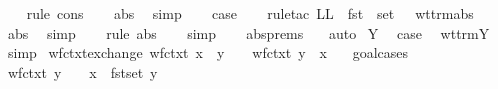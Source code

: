 \begin{isabellebody}
\ \ \isamarkupfalse%
\ {\isacharparenleft}rule\ cons{\isacharparenright}\isanewline
\ \ \isamarkupfalse%
\ abs\ \isamarkupfalse%
\ simp{\isacharplus}\isanewline
\isanewline
\ \ \isamarkupfalse%
\ {\isacharquery}case\isanewline
\ \ \isamarkupfalse%
\ {\isacharparenleft}rule{\isacharunderscore}tac\ L{\isacharequal}{\isachardoublequoteopen}L\ {\isasymunion}\ fst\ {\isacharbackquote}\ set\ {\isasymGamma}{\isacharprime}{\isachardoublequoteclose}\ \ wt{\isacharunderscore}trm{\isachardot}abs{\isacharparenright}\isanewline
\ \ \isamarkupfalse%
\ abs\ \isamarkupfalse%
\ simp\isanewline
\ \ \isamarkupfalse%
\ {\isacharparenleft}rule\ abs{\isacharparenleft}{}{\isacharparenright}{\isacharparenright}\isanewline
\ \ \isamarkupfalse%
\ simp\isanewline
\ \ \isamarkupfalse%
\ abs{\isachardot}prems{\isacharparenleft}{}{\isacharparenright}\ {}\ \isamarkupfalse%
\ auto\isanewline
{}\isamarkupfalse%
\isanewline
{}\isamarkupfalse%
\ Y\ \isamarkupfalse%
\ {\isacharquery}case\ \isamarkupfalse%
\ wt{\isacharunderscore}trm{\isachardot}Y\ \isamarkupfalse%
\ simp\isanewline
{}\isamarkupfalse%
%
\endisatagproof
{\isafoldproof}%
%
\isadelimproof
\isanewline
%
\endisadelimproof
\isanewline
{}\isamarkupfalse%
\ wf{\isacharunderscore}ctxt{\isacharunderscore}exchange{\isacharcolon}\ {\isachardoublequoteopen}wf{\isacharunderscore}ctxt\ {\isacharparenleft}{\isacharparenleft}x{\isacharcomma}{\isasymsigma}{\isacharparenright}\ {\isacharhash}\ {\isacharparenleft}y{\isacharcomma}{\isasympi}{\isacharparenright}\ {\isacharhash}\ {\isasymGamma}{\isacharparenright}\ {\isasymLongrightarrow}\ wf{\isacharunderscore}ctxt\ {\isacharparenleft}{\isacharparenleft}y{\isacharcomma}{\isasympi}{\isacharparenright}\ {\isacharhash}\ {\isacharparenleft}x{\isacharcomma}{\isasymsigma}{\isacharparenright}\ {\isacharhash}\ {\isasymGamma}{\isacharparenright}{\isachardoublequoteclose}\isanewline
%
\isadelimproof
%
\endisadelimproof
%
\isatagproof
{}\isamarkupfalse%
\ goal{\isacharunderscore}cases\isanewline
{}\isamarkupfalse%
\ {}\ \isanewline
\ \ \isamarkupfalse%
\ \isamarkupfalse%
\ {\isachardoublequoteopen}wf{\isacharunderscore}ctxt\ {\isacharparenleft}{\isacharparenleft}y{\isacharcomma}{\isasympi}{\isacharparenright}\ {\isacharhash}\ {\isasymGamma}{\isacharparenright}\ {\isasymand}\ x\ {\isasymnotin}\ fst{\isacharbackquote}set\ {\isacharparenleft}{\isacharparenleft}y{\isacharcomma}{\isasympi}{\isacharparenright}\ {\isacharhash}\ {\isasymGamma}{\isacharparenright}{\isachardoublequoteclose}\ \isamarkupfalse%

\end{isabellebody}
